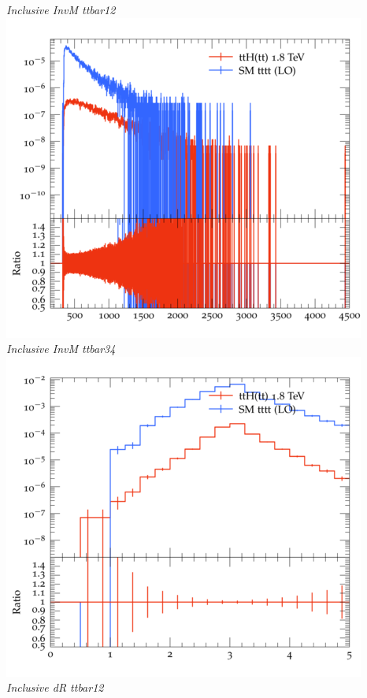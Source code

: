 \documentclass{beamer}
\begin{document}
\begin{frame}
\begin{columns}
\textit{\small Inclusive InvM ttbar12}
\includegraphics[width=\textwidth]{../plots/ttH_1800/tttt_ttH/Inclusive_InvM_ttbar34.png}\\
\textit{\small Inclusive InvM ttbar34}
\includegraphics[width=\textwidth]{../plots/ttH_1800/tttt_ttH/Inclusive_dR_ttbar12.png}\\
\textit{\small Inclusive dR ttbar12}
\end{columns}
\end{frame}
\end{document}
